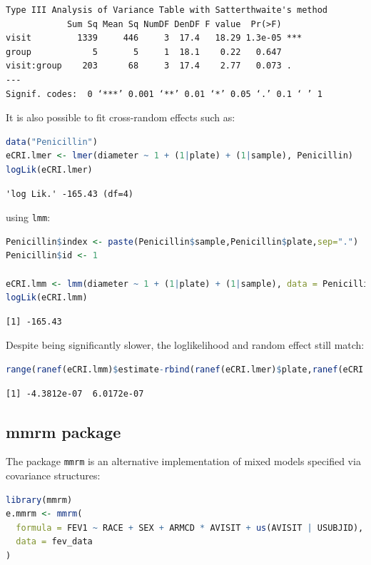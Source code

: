 \documentclass[12pt]{article}
\begin{document}
\label{}
\begin{verbatim}
Type III Analysis of Variance Table with Satterthwaite's method
            Sum Sq Mean Sq NumDF DenDF F value  Pr(>F)    
visit         1339     446     3  17.4   18.29 1.3e-05 ***
group            5       5     1  18.1    0.22   0.647    
visit:group    203      68     3  17.4    2.77   0.073 .  
---
Signif. codes:  0 ‘***’ 0.001 ‘**’ 0.01 ‘*’ 0.05 ‘.’ 0.1 ‘ ’ 1
\end{verbatim}


It is also possible to fit cross-random effects such as:
\begin{lstlisting}[language=r,numbers=none]
data("Penicillin")
eCRI.lmer <- lmer(diameter ~ 1 + (1|plate) + (1|sample), Penicillin)
logLik(eCRI.lmer)
\end{lstlisting}

\label{}
\begin{verbatim}
'log Lik.' -165.43 (df=4)
\end{verbatim}



using \texttt{lmm}:
\begin{lstlisting}[language=r,numbers=none]
Penicillin$index <- paste(Penicillin$sample,Penicillin$plate,sep=".")
Penicillin$id <- 1

eCRI.lmm <- lmm(diameter ~ 1 + (1|plate) + (1|sample), data = Penicillin)
logLik(eCRI.lmm)
\end{lstlisting}

\label{}
\begin{verbatim}
[1] -165.43
\end{verbatim}


Despite being significantly slower, the loglikelihood and random
effect still match:
\begin{lstlisting}[language=r,numbers=none]
range(ranef(eCRI.lmm)$estimate-rbind(ranef(eCRI.lmer)$plate,ranef(eCRI.lmer)$sample))
\end{lstlisting}

\label{}
\begin{verbatim}
[1] -4.3812e-07  6.0172e-07
\end{verbatim}
\subsection{mmrm package}
\label{sec:orgb5b4f59}

The package \texttt{mmrm} is an alternative implementation of mixed models
specified via covariance structures:
\begin{lstlisting}[language=r,numbers=none]
library(mmrm)
e.mmrm <- mmrm(
  formula = FEV1 ~ RACE + SEX + ARMCD * AVISIT + us(AVISIT | USUBJID),
  data = fev_data
)
\end{lstlisting}
\end{document}
